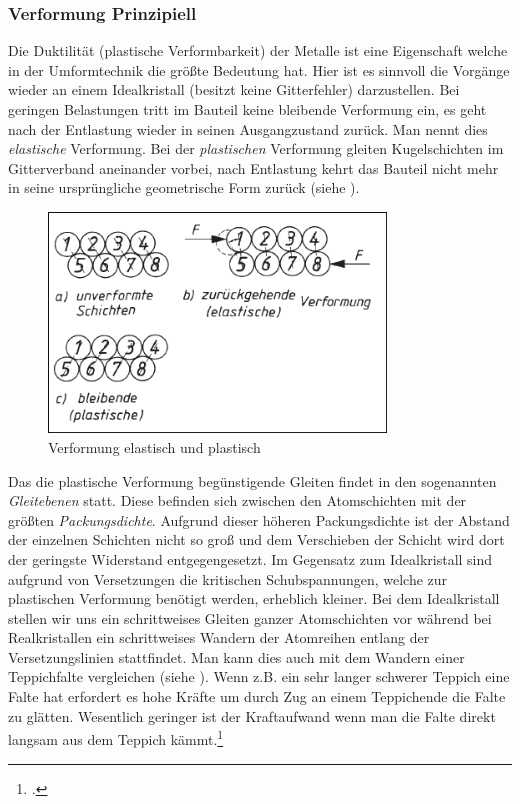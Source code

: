 \documentclass[12pt,a4paper,parskip]{scrartcl}
\begin{document}
{\subsubsection{Verformung Prinzipiell}
Die Duktilität (plastische Verformbarkeit) der Metalle ist eine Eigenschaft welche in der Umformtechnik die größte Bedeutung hat. Hier ist es sinnvoll die Vorgänge wieder an einem Idealkristall (besitzt keine Gitterfehler) darzustellen. Bei geringen Belastungen tritt im Bauteil keine bleibende Verformung ein, es geht nach  der Entlastung wieder in seinen Ausgangzustand zurück. Man nennt dies \emph{elastische} Verformung. Bei der \emph{plastischen} Verformung gleiten Kugelschichten im Gitterverband aneinander vorbei,  nach Entlastung kehrt das Bauteil nicht mehr in seine ursprüngliche geometrische Form zurück (siehe ).
\begin{figure}
\centering
\includegraphics[width=0.8\textwidth]{eloplastkristall}
\caption[Verformung elastisch und plastisch]{Verformung elastisch und plastisch\protect\footnotemark}
\label{fig:eloplastkristall} 
\end{figure}
Das die plastische Verformung begünstigende Gleiten findet in den sogenannten \emph{Gleitebenen} statt. Diese befinden sich zwischen den Atomschichten mit der größten \emph{Packungsdichte}. Aufgrund dieser höheren Packungsdichte ist der Abstand der einzelnen Schichten nicht so groß und dem Verschieben der Schicht wird dort der  geringste Widerstand entgegengesetzt. Im Gegensatz zum Idealkristall sind aufgrund von Versetzungen die kritischen Schubspannungen, welche zur plastischen Verformung benötigt werden,  erheblich kleiner. Bei dem Idealkristall stellen wir uns ein schrittweises Gleiten ganzer Atomschichten vor während bei Realkristallen ein schrittweises Wandern der Atomreihen entlang der Versetzungslinien stattfindet. Man kann dies auch mit dem Wandern einer Teppichfalte vergleichen (siehe ). Wenn z.B. ein sehr langer schwerer Teppich eine Falte hat erfordert es hohe Kräfte um durch Zug an einem Teppichende die Falte zu glätten. Wesentlich geringer ist der Kraftaufwand wenn man die Falte direkt langsam aus dem Teppich kämmt.\footcite[Vgl.][45-53]{wk}
}
\end{document}
